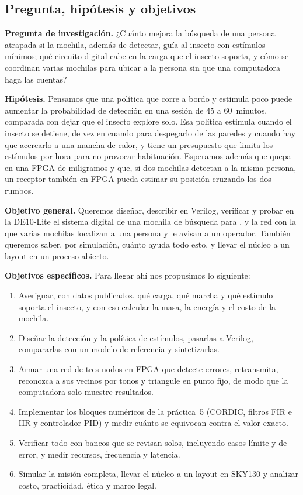 \subsection{Pregunta, hipótesis y objetivos}

\begin{infobox}
\textbf{Pregunta de investigación.} ¿Cuánto mejora la búsqueda de una persona atrapada si la mochila,
además de detectar, guía al insecto con estímulos mínimos; qué circuito digital cabe en la carga que
el insecto soporta, y cómo se coordinan varias mochilas para ubicar a la persona sin que una
computadora haga las cuentas?
\end{infobox}

\textbf{Hipótesis.} Pensamos que una política que corre a bordo y estimula poco puede aumentar la probabilidad de
detección en una sesión de 45 a 60~minutos, comparada con dejar que el insecto explore solo. Esa política estimula cuando
el insecto se detiene, de vez en cuando para despegarlo de las paredes y cuando hay que acercarlo a una mancha de calor, y
tiene un presupuesto que limita los estímulos por hora para no provocar habituación. Esperamos además que quepa en una
FPGA de miligramos y que, si dos mochilas detectan a la misma persona, un receptor también en FPGA pueda estimar su
posición cruzando los dos rumbos.

\textbf{Objetivo general.} Queremos diseñar, describir en Verilog, verificar y probar en la DE10-Lite el sistema digital de una
mochila de búsqueda para \Gp{}, y la red con la que varias mochilas localizan a una persona y le avisan a un operador. También
queremos saber, por simulación, cuánto ayuda todo esto, y llevar el núcleo a un layout en un proceso abierto.

\textbf{Objetivos específicos.} Para llegar ahí nos propusimos lo siguiente:
\begin{enumerate}
  \item Averiguar, con datos publicados, qué carga, qué marcha y qué estímulo soporta el insecto, y con eso calcular la masa, la
        energía y el costo de la mochila.
  \item Diseñar la detección y la política de estímulos, pasarlas a Verilog, compararlas con un modelo de referencia y
        sintetizarlas.
  \item Armar una red de tres nodos en FPGA que detecte errores, retransmita, reconozca a sus vecinos por tonos y triangule en
        punto fijo, de modo que la computadora solo muestre resultados.
  \item Implementar los bloques numéricos de la práctica~5 (CORDIC, filtros FIR e IIR y controlador PID) y medir cuánto se
        equivocan contra el valor exacto.
  \item Verificar todo con bancos que se revisan solos, incluyendo casos límite y de error, y medir recursos, frecuencia y
        latencia.
  \item Simular la misión completa, llevar el núcleo a un layout en SKY130 y analizar costo, practicidad, ética y marco legal.
\end{enumerate}

